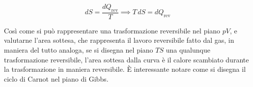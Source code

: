 \[
	dS = \frac{dQ_{\text{rev} } }{T} \implies T\,dS = dQ_{\text{rev} }
\]

Così come si può rappresentare una trasformazione reversibile nel piano $pV$,  e valutarne l'area sottesa, che rappresenta il lavoro reversibile fatto dal gas, in maniera del tutto analoga, se si disegna nel piano $TS$ una qualunque trasformazione reversibile, l'area sottesa dalla curva è il calore scambiato durante la trasformazione in maniera reversibile. È interessante notare come si disegna il ciclo di Carnot nel piano di Gibbs.

\begin{figure}[htpb]
	\centering


	\begin{tikzpicture}[x=0.75pt,y=0.75pt,yscale=-1,xscale=1]


\end{tikzpicture}
\end{figure}
